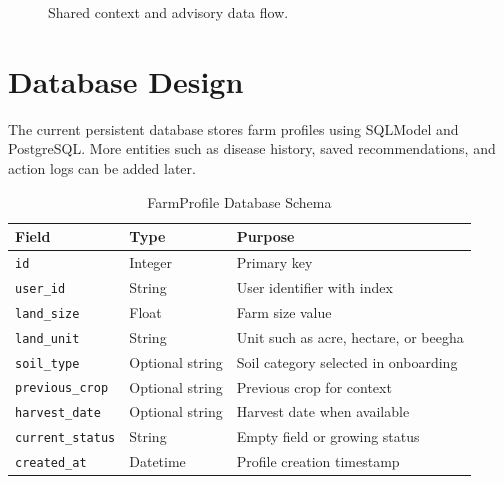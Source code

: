 \documentclass[12pt,a4paper]{report}
\begin{document}
\begin{figure}[H]
\centering
{}
\caption{Shared context and advisory data flow.}
\label{fig:dataflow}
\end{figure}

\section{Database Design}

The current persistent database stores farm profiles using SQLModel and PostgreSQL. More entities such as disease history, saved recommendations, and action logs can be added later.

\begin{table}[H]
\centering
\caption{FarmProfile Database Schema}
\label{tab:dbschema}
\small
\begin{tabular}{p{3.6cm}p{3.2cm}p{6.1cm}}
\toprule
\textbf{Field} & \textbf{Type} & \textbf{Purpose} \\
\midrule
\texttt{id} & Integer & Primary key \\
\texttt{user\_id} & String & User identifier with index \\
\texttt{land\_size} & Float & Farm size value \\
\texttt{land\_unit} & String & Unit such as acre, hectare, or beegha \\
\texttt{soil\_type} & Optional string & Soil category selected in onboarding \\
\texttt{previous\_crop} & Optional string & Previous crop for context \\
\texttt{harvest\_date} & Optional string & Harvest date when available \\
\texttt{current\_status} & String & Empty field or growing status \\
\texttt{created\_at} & Datetime & Profile creation timestamp \\
\bottomrule
\end{tabular}
\end{table}
\end{document}
